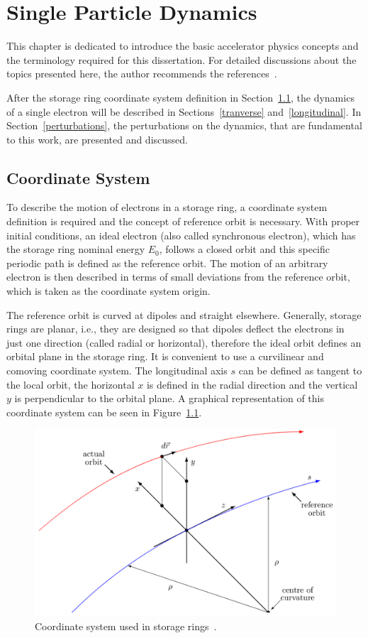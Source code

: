 \chapter{Single Particle Dynamics}
This chapter is dedicated to introduce the basic accelerator physics concepts and the terminology required for this dissertation. For detailed discussions about the topics presented here, the author recommends the references~\cite{sands1970physics, wiedemann2007physics}.

After the storage ring coordinate system definition in Section~\ref{coord}, the dynamics of a single electron will be described in Sections~\ref{tranverse} and~\ref{longitudinal}. In Section~\ref{perturbations}, the perturbations on the dynamics, that are fundamental to this work, are presented and discussed.
\section{Coordinate System}\label{coord}
To describe the motion of electrons in a storage ring, a coordinate system definition is required and the concept of reference orbit is necessary. With proper initial conditions, an ideal electron (also called synchronous electron), which has the storage ring nominal energy $E_0$, follows a closed orbit and this specific periodic path is defined as the reference orbit. The motion of an arbitrary electron is then described in terms of small deviations from the reference orbit, which is taken as the coordinate system origin. 

The reference orbit is curved at dipoles and straight elsewhere. Generally, storage rings are planar, i.e., they are designed so that dipoles deflect the electrons in just one direction (called radial or horizontal), therefore the ideal orbit defines an orbital plane in the storage ring. It is convenient to use a curvilinear and comoving coordinate system. The longitudinal axis $s$ can be defined as tangent to the local orbit, the horizontal $x$ is defined in the radial direction and the vertical $y$ is perpendicular to the orbital plane. A graphical representation of this coordinate system can be seen in Figure~\ref{syst}.
\begin{figure}
    \centering
    \includegraphics[scale=0.25]{figures/reference_system.png}
    \caption{Coordinate system used in storage rings~\cite{madx}.}
    \label{syst}
\end{figure}

